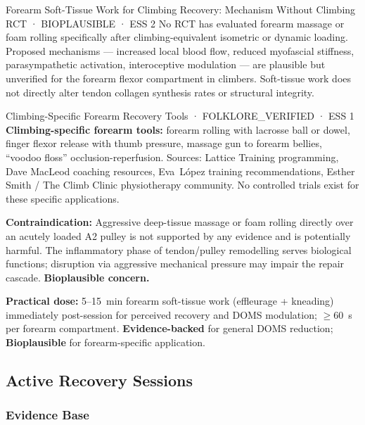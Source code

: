 \begin{bioplausbox}{Forearm Soft-Tissue Work for Climbing Recovery: Mechanism Without Climbing RCT · BIOPLAUSIBLE · ESS 2}
No RCT has evaluated forearm massage or foam rolling specifically after climbing-equivalent isometric or dynamic loading. Proposed mechanisms --- increased local blood flow, reduced myofascial stiffness, parasympathetic activation, interoceptive modulation --- are plausible but unverified for the forearm flexor compartment in climbers. Soft-tissue work does not directly alter tendon collagen synthesis rates or structural integrity.
\end{bioplausbox}

\begin{folklorebox}{Climbing-Specific Forearm Recovery Tools · FOLKLORE\_VERIFIED · ESS 1}
\textbf{Climbing-specific forearm tools:} forearm rolling with lacrosse ball or dowel, finger flexor release with thumb pressure, massage gun to forearm bellies, ``voodoo floss'' occlusion-reperfusion. Sources: Lattice Training programming, Dave MacLeod coaching resources, Eva~L\'opez training recommendations, Esther Smith / The Climb Clinic physiotherapy community. No controlled trials exist for these specific applications.
\end{folklorebox}

\textbf{Contraindication:} Aggressive deep-tissue massage or foam rolling directly over an acutely loaded A2 pulley is not supported by any evidence and is potentially harmful. The inflammatory phase of tendon/pulley remodelling serves biological functions; disruption via aggressive mechanical pressure may impair the repair cascade. \textbf{Bioplausible concern.}

\textbf{Practical dose:} 5--15~min forearm soft-tissue work (effleurage + kneading) immediately post-session for perceived recovery and DOMS modulation; $\geq$60~s per forearm compartment. \textbf{Evidence-backed} for general DOMS reduction; \textbf{Bioplausible} for forearm-specific application.

\subsection{Active Recovery Sessions}

\subsubsection*{Evidence Base}

